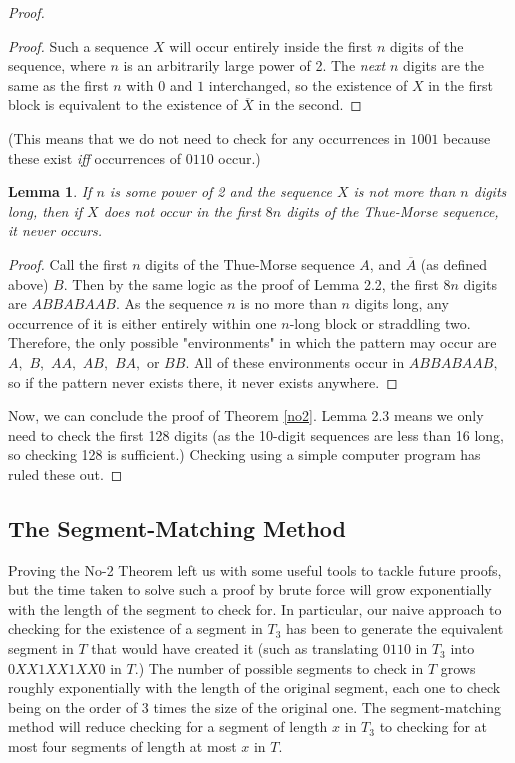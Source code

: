 \documentclass{article}
\newtheorem{lemma}{Lemma}[section]
\begin{document}
\begin{proof}
\begin{proof}
Such a sequence $X$ will occur entirely inside the first $n$ digits of the sequence, where $n$ is an arbitrarily large power of 2. The \emph{next} $n$ digits are the same as the first $n$ with $0$ and $1$ interchanged, so the existence of $X$ in the first block is equivalent to the existence of $\overline{X}$ in the second.
\end{proof}

(This means that we do not need to check for any occurrences in $1001$ because these exist \emph{iff} occurrences of $0110$ occur.)

\begin{lemma}
\label{recurrence}
If $n$ is some power of 2 and the sequence $X$ is not more than $n$ digits long, then if $X$ does not occur in the first $8n$ digits of the Thue-Morse sequence, it never occurs.
\end{lemma}

\begin{proof}
Call the first $n$ digits of the Thue-Morse sequence $A$, and $\overline{A}$ (as defined above) $B.$ Then by the same logic as the proof of Lemma 2.2, the first $8n$ digits are $ABBABAAB.$ As the sequence $n$ is no more than $n$ digits long, any occurrence of it is either entirely within one $n$-long block or straddling two. Therefore, the only possible "environments" in which the pattern may occur are $A,$ $B,$ $AA,$ $AB,$ $BA,$ or $BB.$ All of these environments occur in $ABBABAAB,$ so if the pattern never exists there, it never exists anywhere.
\end{proof}

Now, we can conclude the proof of Theorem \ref{no2}. Lemma 2.3 means we only need to check the first 128 digits (as the 10-digit sequences are less than 16 long, so checking 128 is sufficient.) Checking using a simple computer program has ruled these out.
\end{proof}

\subsection{The Segment-Matching Method}

Proving the No-2 Theorem left us with some useful tools to tackle future proofs, but the time taken to solve such a proof by brute force will grow exponentially with the length of the segment to check for. In particular, our naive approach to checking for the existence of a segment in $T_3$ has been to generate the equivalent segment in $T$ that would have created it (such as translating $0110$ in $T_3$ into $0XX1XX1XX0$ in $T$.) The number of possible segments to check in $T$ grows roughly exponentially with the length of the original segment, each one to check being on the order of 3 times the size of the original one. The segment-matching method will reduce checking for a segment of length $x$ in $T_3$ to checking for at most four segments of length at most $x$ in $T.$
\end{document}
